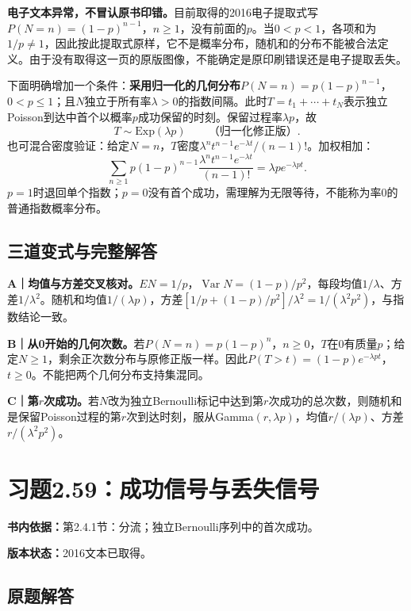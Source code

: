 \documentclass[
  11pt,
  a4paper,
  UTF8,fontset=fandol]{ctexart}
\let\OldSection\section
\renewcommand{\section}{\Needspace{7\baselineskip}\OldSection}
\let\OldSubsection\subsection
\renewcommand{\subsection}{\Needspace{5\baselineskip}\OldSubsection}
\begin{document}
\textbf{电子文本异常，不冒认原书印错。}目前取得的2016电子提取式写\(P(N=n)=(1-p)^{n-1}\)，\(n\ge1\)，没有前面的\(p\)。当\(0<p<1\)，各项和为\(1/p\ne1\)，因此按此提取式原样，它不是概率分布，随机和的分布不能被合法定义。由于没有取得这一页的原版图像，不能确定是原印刷错误还是电子提取丢失。

下面明确增加一个条件：\textbf{采用归一化的几何分布\(P(N=n)=p(1-p)^{n-1}\)}，\(0<p\le1\)；且\(N\)独立于所有率\(\lambda>0\)的指数间隔。此时\(T=t_1+\cdots+t_N\)表示独立Poisson到达中首个以概率\(p\)成功保留的时刻。保留过程率\(\lambda p\)，故
\[\boxed{T\sim\mathrm{Exp}(\lambda p)}\qquad\text{（归一化修正版）}.\]
也可混合密度验证：给定\(N=n\)，\(T\)密度\(\lambda^nt^{n-1}e^{-\lambda t}/(n-1)!\)。加权相加：
\[\sum_{n\ge1}p(1-p)^{n-1}\frac{\lambda^nt^{n-1}e^{-\lambda t}}{(n-1)!}=\lambda p e^{-\lambda pt}.\]
\(p=1\)时退回单个指数；\(p=0\)没有首个成功，需理解为无限等待，不能称为率0的普通指数概率分布。

\subsection{三道变式与完整解答}\label{ux4e09ux9053ux53d8ux5f0fux4e0eux5b8cux6574ux89e3ux7b54-57}

\textbf{A｜均值与方差交叉核对。}\(EN=1/p\)，\(\operatorname{Var}N=(1-p)/p^2\)，每段均值\(1/\lambda\)、方差\(1/\lambda^2\)。随机和均值\(1/(\lambda p)\)，方差\([1/p+(1-p)/p^2]/\lambda^2=1/(\lambda^2p^2)\)，与指数结论一致。

\textbf{B｜从0开始的几何次数。}若\(P(N=n)=p(1-p)^n\)，\(n\ge0\)，\(T\)在0有质量\(p\)；给定\(N\ge1\)，剩余正次数分布与原修正版一样。因此\(P(T>t)=(1-p)e^{-\lambda pt}\)，\(t\ge0\)。不能把两个几何分布支持集混同。

\textbf{C｜第\(r\)次成功。}若\(N\)改为独立Bernoulli标记中达到第\(r\)次成功的总次数，则随机和是保留Poisson过程的第\(r\)次到达时刻，服从Gamma\((r,\lambda p)\)，均值\(r/(\lambda p)\)、方差\(r/(\lambda^2p^2)\)。

\newpage

\section{习题2.59：成功信号与丢失信号}\label{ux4e60ux98982.59ux6210ux529fux4fe1ux53f7ux4e0eux4e22ux5931ux4fe1ux53f7}

\textbf{书内依据：}第2.4.1节：分流；独立Bernoulli序列中的首次成功。

\textbf{版本状态：}2016文本已取得。

\subsection{原题解答}\label{ux539fux9898ux89e3ux7b54-58}
\end{document}
